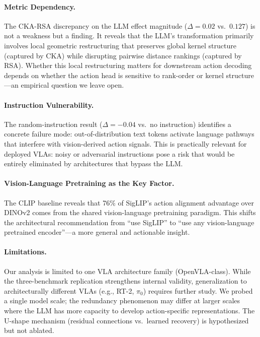 \documentclass[letterpaper]{article}
\begin{document}
\paragraph{Metric Dependency.}
The CKA-RSA discrepancy on the LLM effect magnitude ($\Delta=0.02$ vs.\ $0.127$) is not a weakness but a finding.
It reveals that the LLM's transformation primarily involves local geometric restructuring that preserves global kernel structure (captured by CKA) while disrupting pairwise distance rankings (captured by RSA).
Whether this local restructuring matters for downstream action decoding depends on whether the action head is sensitive to rank-order or kernel structure---an empirical question we leave open.

\paragraph{Instruction Vulnerability.}
The random-instruction result ($\Delta=-0.04$ vs.\ no instruction) identifies a concrete failure mode: out-of-distribution text tokens activate language pathways that interfere with vision-derived action signals.
This is practically relevant for deployed VLAs: noisy or adversarial instructions pose a risk that would be entirely eliminated by architectures that bypass the LLM.

\paragraph{Vision-Language Pretraining as the Key Factor.}
The CLIP baseline reveals that 76\% of SigLIP's action alignment advantage over DINOv2 comes from the shared vision-language pretraining paradigm.
This shifts the architectural recommendation from ``use SigLIP'' to ``use any vision-language pretrained encoder''---a more general and actionable insight.

\paragraph{Limitations.}
Our analysis is limited to one VLA architecture family (OpenVLA-class).
While the three-benchmark replication strengthens internal validity, generalization to architecturally different VLAs (e.g., RT-2, $\pi_0$) requires further study.
We probed a single model scale; the redundancy phenomenon may differ at larger scales where the LLM has more capacity to develop action-specific representations.
The U-shape mechanism (residual connections vs.\ learned recovery) is hypothesized but not ablated.
\end{document}
